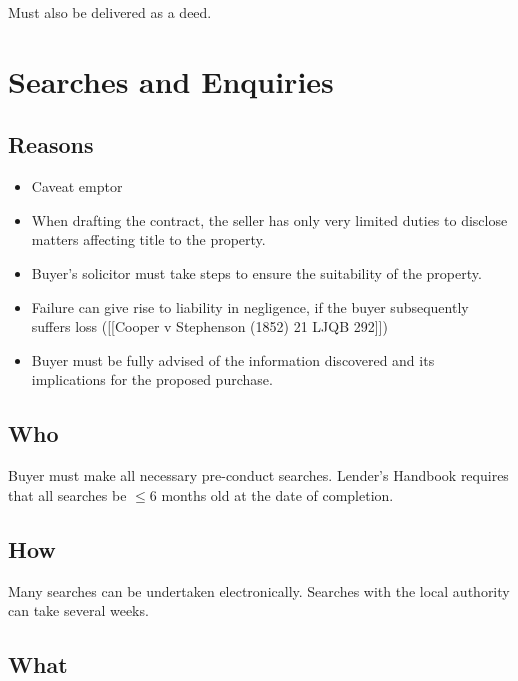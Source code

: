 \documentclass[
]{article}
\providecommand{\tightlist}{%
  \setlength{\itemsep}{0pt}\setlength{\parskip}{0pt}}
\begin{document}
Must also be delivered as a deed.

\hypertarget{searches-and-enquiries}{%
\section{Searches and Enquiries}\label{searches-and-enquiries}}

\hypertarget{reasons}{%
\subsection{Reasons}\label{reasons}}

\begin{itemize}
\tightlist
\item
  Caveat emptor
\item
  When drafting the contract, the seller has only very limited duties to
  disclose matters affecting title to the property.
\item
  Buyer's solicitor must take steps to ensure the suitability of the
  property.
\item
  Failure can give rise to liability in negligence, if the buyer
  subsequently suffers loss ({[}{[}Cooper v Stephenson (1852) 21 LJQB
  292{]}{]})
\item
  Buyer must be fully advised of the information discovered and its
  implications for the proposed purchase.
\end{itemize}

\hypertarget{who}{%
\subsection{Who}\label{who}}

Buyer must make all necessary pre-conduct searches. Lender's Handbook
requires that all searches be \(\leq 6\) months old at the date of
completion.

\hypertarget{how}{%
\subsection{How}\label{how}}

Many searches can be undertaken electronically. Searches with the local
authority can take several weeks.

\hypertarget{what}{%
\subsection{What}\label{what}}
\end{document}
